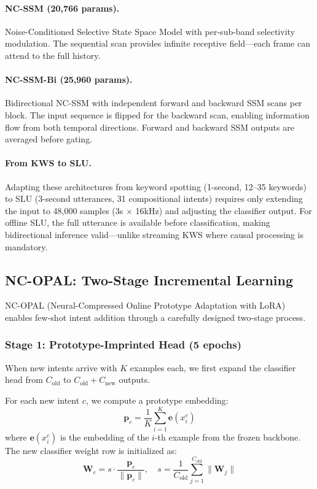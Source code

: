 \documentclass[11pt]{article}
\begin{document}
\paragraph{NC-SSM (20,766 params).}
Noise-Conditioned Selective State Space Model with per-sub-band selectivity modulation.
The sequential scan provides infinite receptive field---each frame can attend to the full history.

\paragraph{NC-SSM-Bi (25,960 params).}
Bidirectional NC-SSM with independent forward and backward SSM scans per block.
The input sequence is flipped for the backward scan, enabling information flow from both temporal directions.
Forward and backward SSM outputs are averaged before gating.

\paragraph{From KWS to SLU.}
Adapting these architectures from keyword spotting (1-second, 12--35 keywords) to SLU (3-second utterances, 31 compositional intents) requires only extending the input to 48,000 samples (3s $\times$ 16kHz) and adjusting the classifier output.
For offline SLU, the full utterance is available before classification, making bidirectional inference valid---unlike streaming KWS where causal processing is mandatory.

\subsection{NC-OPAL: Two-Stage Incremental Learning}
\label{sec:ncopal}

NC-OPAL (Neural-Compressed Online Prototype Adaptation with LoRA) enables few-shot intent addition through a carefully designed two-stage process.

\subsubsection{Stage 1: Prototype-Imprinted Head (5 epochs)}

When new intents arrive with $K$ examples each, we first expand the classifier head from $C_{\text{old}}$ to $C_{\text{old}} + C_{\text{new}}$ outputs.

For each new intent $c$, we compute a prototype embedding:
\begin{equation}
\mathbf{p}_c = \frac{1}{K} \sum_{i=1}^{K} \mathbf{e}(x_i^c)
\end{equation}
where $\mathbf{e}(x_i^c)$ is the embedding of the $i$-th example from the frozen backbone.
The new classifier weight row is initialized as:
\begin{equation}
\mathbf{W}_{c} = s \cdot \frac{\mathbf{p}_c}{\|\mathbf{p}_c\|}, \quad s = \frac{1}{C_{\text{old}}} \sum_{j=1}^{C_{\text{old}}} \|\mathbf{W}_j\|
\end{equation}
\end{document}
